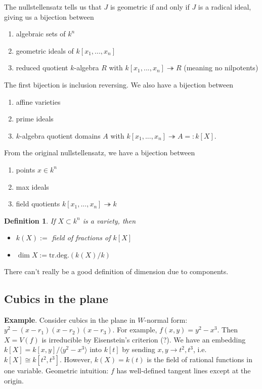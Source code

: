 \documentclass[letterpaper, 12pt]{article}
\newtheorem{definition}[thm]{Definition}
\newcommand{\iso}{\cong}
\newcommand{\polyring}[3]{#1[x_{#2}, ..., x_{#3}]}
\begin{document}
The nullstellensatz tells us that $J$ is geometric if and only if $J$ is a radical ideal, giving us a bijection between
\begin{enumerate}
\item algebraic sets of $k^n$
\item geometric ideals of $\polyring k 1 n$
\item reduced quotient $k$-algebra $R$ with $\polyring k 1 n \twoheadrightarrow R$ (meaning no nilpotents)
\end{enumerate}

The first bijection is inclusion reversing.  We also have a bijection between
\begin{enumerate}
\item affine varieties
\item prime ideals
\item $k$-algebra quotient domains $A$ with $\polyring k 1 n \twoheadrightarrow A =: k[X]$.
\end{enumerate}

From the original nullstellensatz, we have a bijection between
\begin{enumerate}
\item points $x \in k^n$
\item max ideals
\item field quotients $\polyring k 1 n \twoheadrightarrow k$
\end{enumerate}

\begin{definition}
If $X \subset k^n$ is a variety, then
  \begin{itemize}
    \item $k(X) :=$ field of fractions of $k[X]$
    \item $\dim X := \mathrm{tr. deg.} (k(X)/k)$
  \end{itemize}
\end{definition}

There can't really be a good definition of dimension due to components.

\subsection{Cubics in the plane}

\textbf{Example}. Consider cubics in the plane in $W$-normal form: $y^2 - (x - r_1)(x - r_2)(x - r_3)$. For example, $f(x,y) = y^2 - x^3$. Then $X = V(f)$ is irreducible by Eisenstein's criterion (?). We have an embedding $k[X] = k[x,y]/\langle y^2 - x^3 \rangle$ into $k[t]$ by sending $x, y \rightarrow t^2, t^3$, i.e. $k[X] \iso k[t^2, t^3]$. However, $k(X) = k(t)$ is the field of rational functions in one variable. Geometric intuition: $f$ has well-defined tangent lines except at the origin.
\end{document}
